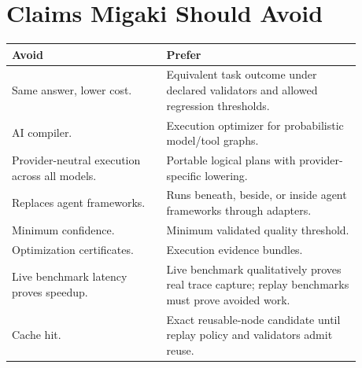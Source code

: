 \section{Claims Migaki Should Avoid}

\begin{center}
\small
\begin{tabular}{p{0.39\linewidth}p{0.49\linewidth}}
\toprule
\textbf{Avoid} & \textbf{Prefer} \\
\midrule
Same answer, lower cost. & Equivalent task outcome under declared validators and allowed regression thresholds. \\
AI compiler. & Execution optimizer for probabilistic model/tool graphs. \\
Provider-neutral execution across all models. & Portable logical plans with provider-specific lowering. \\
Replaces agent frameworks. & Runs beneath, beside, or inside agent frameworks through adapters. \\
Minimum confidence. & Minimum validated quality threshold. \\
Optimization certificates. & Execution evidence bundles. \\
Live benchmark latency proves speedup. & Live benchmark qualitatively proves real trace capture; replay benchmarks must prove avoided work. \\
Cache hit. & Exact reusable-node candidate until replay policy and validators admit reuse. \\
\bottomrule
\end{tabular}
\end{center}

